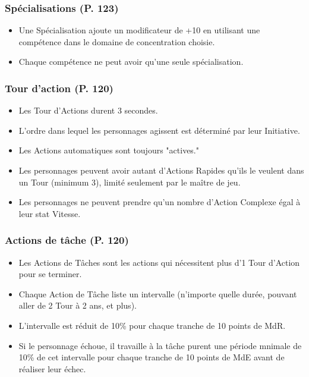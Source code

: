 \subsubsection{Spécialisations (P. 123)} 

\begin{itemize} \item Une Spécialisation ajoute un modificateur de +10 en utilisant une compétence dans le domaine de concentration choisie. \item Chaque compétence ne peut avoir qu'une seule spécialisation. \end{itemize} 

\subsubsection{Tour d'action (P. 120)} 

\begin{itemize} \item Les Tour d'Actions durent 3 secondes. \item L'ordre dans lequel les personnages agissent est déterminé par leur Initiative. \item Les Actions automatiques sont toujours "actives." \item Les personnages peuvent avoir autant d'Actions Rapides qu'ils le veulent dans un Tour (minimum 3), limité seulement par le maître de jeu. \item Les personnages ne peuvent prendre qu'un nombre d'Action Complexe égal à leur stat Vitesse. \end{itemize} 

\subsubsection{Actions de tâche (P. 120)} 

\begin{itemize} \item Les Actions de Tâches sont les actions qui nécessitent plus d'1 Tour d'Action pour se terminer. \item Chaque Action de Tâche liste un intervalle (n'importe quelle durée, pouvant aller de 2 Tour à 2 ans, et plus). \item L'intervalle est réduit de 10\% pour chaque tranche de 10 points de MdR. \item Si le personnage échoue, il travaille à la tâche purent une période mnimale de 10\% de cet intervalle pour chaque tranche de 10 points de MdE avant de réaliser leur échec. \end{itemize} 



